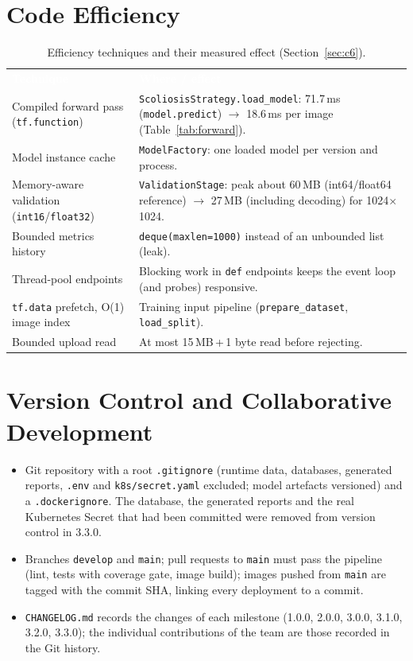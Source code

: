 \documentclass[12pt,a4paper]{article}
\newcommand{\fp}[1]{\nolinkurl{#1}}
\newcommand{\hd}[1]{\textcolor{white}{\textbf{#1}}}
\begin{document}
\section{Code Efficiency}

\begin{table}[H]
\centering
\caption{Efficiency techniques and their measured effect (Section~\ref{sec:c6}).}
\label{tab:efficiency}
\renewcommand{\arraystretch}{1.25}
\begin{tabularx}{\textwidth}{L{4.3cm} Y}
\hd{Technique} & \hd{Where / effect} \\
Compiled forward pass (\texttt{tf.function}) & \fp{ScoliosisStrategy.load_model}: 71.7\,ms (\texttt{model.predict}) $\to$ 18.6\,ms per image (Table~\ref{tab:forward}). \\
Model instance cache & \texttt{ModelFactory}: one loaded model per version and process. \\
Memory-aware validation (\texttt{int16}/\texttt{float32}) & \texttt{ValidationStage}: peak about 60\,MB (int64/float64 reference) $\to$ 27\,MB (including decoding) for 1024$\times$1024. \\
Bounded metrics history & \fp{deque(maxlen=1000)} instead of an unbounded list (leak). \\
Thread-pool endpoints & Blocking work in \texttt{def} endpoints keeps the event loop (and probes) responsive. \\
\texttt{tf.data} prefetch, O(1) image index & Training input pipeline (\texttt{prepare\_dataset}, \texttt{load\_split}). \\
Bounded upload read & At most 15\,MB\,+\,1 byte read before rejecting. \\
\end{tabularx}
\end{table}

\section{Version Control and Collaborative Development}

\begin{itemize}[leftmargin=*]
    \item Git repository with a root \texttt{.gitignore} (runtime data, databases, generated reports, \texttt{.env} and
          \texttt{k8s/secret.yaml} excluded; model artefacts versioned) and a \texttt{.dockerignore}. The database, the generated
          reports and the real Kubernetes Secret that had been committed were removed from version control in 3.3.0.
    \item Branches \texttt{develop} and \texttt{main}; pull requests to \texttt{main} must pass the
          pipeline (lint, tests with coverage gate, image build); images pushed from \texttt{main} are
          tagged with the commit SHA, linking every deployment to a commit.
    \item \texttt{CHANGELOG.md} records the changes of each milestone (1.0.0, 2.0.0, 3.0.0, 3.1.0, 3.2.0, 3.3.0); the
          individual contributions of the team are those recorded in the Git history.
\end{itemize}
\end{document}
